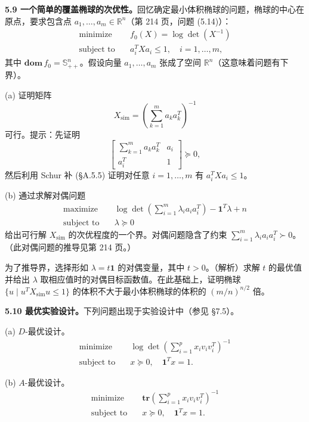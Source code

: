 \documentclass[UTF8, 12pt, fontset=fandol, oneside]{ctexart}
\begin{document}
\noindent\textbf{5.9 一个简单的覆盖椭球的次优性。}\quad 回忆确定最小体积椭球的问题，椭球的中心在原点，要求包含点 $a_1,\ldots,a_m\in\mathbb{R}^n$（第 214 页，问题 (5.14)）：
\[
\begin{aligned}
\text{minimize}\quad & f_0(X)=\log\det(X^{-1})\\
\text{subject to}\quad & a_i^TXa_i\leq 1,\quad i=1,\ldots,m,
\end{aligned}
\]
其中 $\mathbf{dom}\,f_0=\mathbb{S}_{++}^n$。假设向量 $a_1,\ldots,a_m$ 张成了空间 $\mathbb{R}^n$（这意味着问题有下界）。

(a) 证明矩阵
\[
X_{\mathrm{sim}}=\left(\sum_{k=1}^m a_ka_k^T\right)^{-1}
\]
可行。提示：先证明
\[
\begin{bmatrix}
\sum_{k=1}^m a_ka_k^T & a_i\\
a_i^T & 1
\end{bmatrix}\succeq 0,
\]
然后利用 Schur 补 (§A.5.5) 证明对任意 $i=1,\ldots,m$ 有 $a_i^TXa_i\leq 1$。

(b) 通过求解对偶问题
\[
\begin{aligned}
\text{maximize}\quad & \log\det\left(\sum_{i=1}^m\lambda_i a_ia_i^T\right)-\mathbf{1}^T\lambda+n\\
\text{subject to}\quad & \lambda\succeq 0
\end{aligned}
\]
给出可行解 $X_{\mathrm{sim}}$ 的次优程度的一个界。对偶问题隐含了约束 $\sum_{i=1}^m\lambda_i a_ia_i^T\succ 0$。（此对偶问题的推导见第 214 页。）

为了推导界，选择形如 $\lambda=t\mathbf{1}$ 的对偶变量，其中 $t>0$。（解析）求解 $t$ 的最优值并给出 $\lambda$ 取相应值时的对偶目标函数值。在此基础上，证明椭球 $\{u\mid u^TX_{\mathrm{sim}}u\leq 1\}$ 的体积不大于最小体积椭球的体积的 $(m/n)^{n/2}$ 倍。

\noindent\textbf{5.10 最优实验设计。}\quad 下列问题出现于实验设计中（参见 §7.5）。

(a) $D$-最优设计。
\[
\begin{aligned}
\text{minimize}\quad & \log\det\left(\sum_{i=1}^p x_iv_iv_i^T\right)^{-1}\\
\text{subject to}\quad & x\succeq 0,\quad \mathbf{1}^Tx=1.
\end{aligned}
\]

(b) $A$-最优设计。
\[
\begin{aligned}
\text{minimize}\quad & \mathbf{tr}\left(\sum_{i=1}^p x_iv_iv_i^T\right)^{-1}\\
\text{subject to}\quad & x\succeq 0,\quad \mathbf{1}^Tx=1.
\end{aligned}
\]
\end{document}
